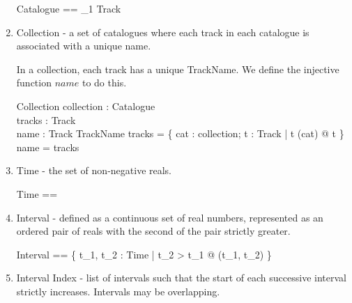 \documentclass[11pt]{article}
\begin{document}
\begin{enumerate}
\begin{zed}
	Catalogue  == \seq_1 Track 
\end{zed}

\item \textsf{Collection} - a set of catalogues where each track in each catalogue is associated with a unique name.

In a collection, each track has a unique \textsf{TrackName}. We define the injective function $name$ to do this. 

\begin{zed}
	[TrackName]
\end{zed}

\begin{schema}{Collection}
	collection : \power Catalogue 		\\
	tracks : \power Track 			\\
	name : Track \inj TrackName 
\where
	tracks = \{ cat : collection; t : Track | t \in (\ran cat) @ t \}  \\
	\dom name = tracks
\end{schema}




\item \textsf{Time} - the set of non-negative reals. 


\begin{zed}
	Time == \R
\end{zed}





\item \textsf{Interval} - defined as a continuous set of real numbers,  represented as an ordered pair of reals with the second of the pair strictly greater.  

\begin{flushright}
\end{flushright}

\begin{zed}
	Interval == \{ t_1, t_2 : Time | t_2 > t_1 @ (t_1, t_2) \} 
\end{zed}

\item \textsf{Interval Index} - list of intervals such that the start of each successive interval strictly increases.  Intervals may be overlapping. 


\end{enumerate}
\end{document}
